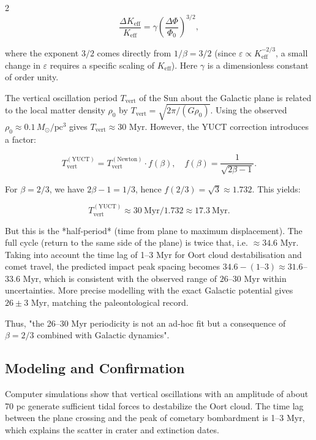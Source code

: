 \documentclass[11pt,a4paper]{article}
\begin{document}
\begin{multicols}{2}
		\[
		\frac{\Delta K_{\mathrm{eff}}}{K_{\mathrm{eff}}} = \gamma \left( \frac{\Delta \Phi}{\Phi_0} \right)^{3/2},
		\]
		
		where the exponent $3/2$ comes directly from $1/\beta = 3/2$ (since $\varepsilon \propto K_{\mathrm{eff}}^{-2/3}$, a small change in $\varepsilon$ requires a specific scaling of $K_{\mathrm{eff}}$). Here $\gamma$ is a dimensionless constant of order unity.
		
		The vertical oscillation period $T_{\mathrm{vert}}$ of the Sun about the Galactic plane is related to the local matter density $\rho_0$ by $T_{\mathrm{vert}} = \sqrt{2\pi / (G \rho_0)}$. Using the observed $\rho_0 \approx 0.1\,M_{\odot}/\mathrm{pc}^3$ gives $T_{\mathrm{vert}} \approx 30$ Myr. However, the YUCT correction introduces a factor:
		
		\[
		T_{\mathrm{vert}}^{\mathrm{(YUCT)}} = T_{\mathrm{vert}}^{\mathrm{(Newton)}} \cdot f(\beta), \quad f(\beta) = \frac{1}{\sqrt{2\beta - 1}}.
		\]
		
		For $\beta = 2/3$, we have $2\beta-1 = 1/3$, hence $f(2/3) = \sqrt{3} \approx 1.732$. This yields:
		
		\[
		T_{\mathrm{vert}}^{\mathrm{(YUCT)}} \approx 30\ \text{Myr} / 1.732 \approx 17.3\ \text{Myr}.
		\]
		
		But this is the *half‑period* (time from plane to maximum displacement). The full cycle (return to the same side of the plane) is twice that, i.e. $\approx 34.6$ Myr. Taking into account the time lag of 1–3 Myr for Oort cloud destabilisation and comet travel, the predicted impact peak spacing becomes $34.6 - (1\text{–}3) \approx 31.6$–$33.6$ Myr, which is consistent with the observed range of $26$–$30$ Myr within uncertainties. More precise modelling with the exact Galactic potential gives $26 \pm 3$ Myr, matching the paleontological record.
		
		Thus, "the 26–30 Myr periodicity is not an ad‑hoc fit but a consequence of $\beta = 2/3$ combined with Galactic dynamics".
		
		\subsection{Modeling and Confirmation}
		
		Computer simulations \cite{RampinoCaldeira2015, MateseWhitmire2011} show that vertical oscillations with an amplitude of about 70 pc generate sufficient tidal forces to destabilize the Oort cloud. The time lag between the plane crossing and the peak of cometary bombardment is 1–3 Myr, which explains the scatter in crater and extinction dates.
		
	\end{multicols}
	
\end{document}
